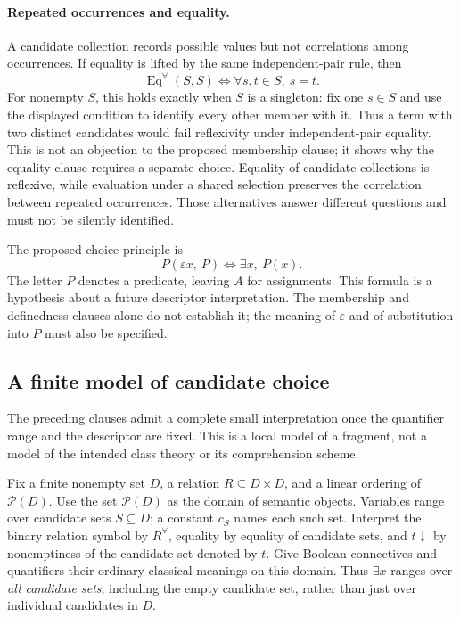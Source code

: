 \paragraph{Repeated occurrences and equality.}
A candidate collection records possible values but not correlations among
occurrences. If equality is lifted by the same independent-pair rule, then
\[
\operatorname{Eq}^{\forall}(S,S)\iff \forall s,t\in S,\ s=t.
\]
For nonempty $S$, this holds exactly when $S$ is a singleton: fix one
$s\in S$ and use the displayed condition to identify every other member
with it. Thus a term with two distinct candidates would fail reflexivity
under independent-pair equality. This is not an objection to the proposed
membership clause; it shows why the equality clause requires a separate
choice. Equality of candidate collections is reflexive, while evaluation
under a shared selection preserves the correlation between repeated
occurrences. Those alternatives answer different questions and must not be
silently identified.

The proposed choice principle is
\[
P(\varepsilon x,\ P)\iff \exists x,\ P(x).
\]
The letter $P$ denotes a predicate, leaving $A$ for assignments. This formula
is a hypothesis about a future descriptor interpretation. The membership
and definedness clauses alone do not establish it; the meaning of
$\varepsilon$ and of substitution into $P$ must also be specified.

\subsection{A finite model of candidate choice}
The preceding clauses admit a complete small interpretation once the
quantifier range and the descriptor are fixed. This is a local model of
a fragment, not a model of the intended class theory or its comprehension
scheme.

Fix a finite nonempty set $D$, a relation $R\subseteq D\times D$, and
a linear ordering of $\mathcal P(D)$. Use the set $\mathcal P(D)$ as
the domain of semantic objects. Variables range over candidate sets
$S\subseteq D$; a constant $c_S$ names each such set. Interpret the
binary relation symbol by $R^{\forall}$, equality by equality of candidate
sets, and $t\downarrow$ by nonemptiness of the candidate set denoted
by $t$. Give Boolean connectives and quantifiers their ordinary
classical meanings on this domain. Thus $\exists x$ ranges over
\emph{all candidate sets}, including the empty candidate set, rather
than just over individual candidates in $D$.

